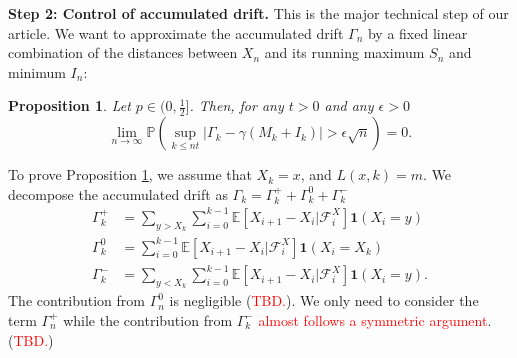 \documentclass[twoside,12pt,a4paper]{article}
\newtheorem{proposition}{Proposition}[section]
\numberwithin{equation}{section}
\newcommand{\abs}[1]{\left\vert #1 \right\vert}
\newcommand\TBD{\textcolor{red}{TBD.}}
\begin{document}
	\textbf{Step 2: Control of accumulated drift.} This is the major technical step of our article. We want to approximate the accumulated drift $\Gamma_n$ by a fixed linear combination of the distances between $X_n$ and its running maximum $S_n$ and minimum $I_n$:
	\begin{proposition}\label{lm: control of acc drift}
		Let $p\in (0,\frac{1}{2}]$. Then, for any $t>0$ and any $\epsilon >0$
		\begin{equation}\label{eq: control of acc drift}
			\lim_{n \to \infty }\mathbb{P}\left(\sup_{k\leq nt} \abs{\Gamma_k - \gamma \left(M_k + I_k \right)   } > \epsilon \sqrt{n}  \right) =0. 
		\end{equation}
	\end{proposition}
	To prove Proposition \ref{lm: control of acc drift}, we assume that $X_k=x $, and $L(x,k)=m$. We decompose the accumulated drift as $\Gamma_k = 	\Gamma_k^+ +	\Gamma_k^0 + \Gamma_k^-$ 
	\begin{align}
		\Gamma_k^+ &= \sum_{y > X_k} \sum_{i = 0}^{k-1} \mathbb{E}\left[ X_{i + 1} - X_i | \mathcal{F}_i^X \right] \mathbf{1}(X_i = y)\\
		\Gamma_k^0 &= \sum_{i = 0}^{k-1} \mathbb{E}\left[ X_{i + 1} - X_i | \mathcal{F}_i^X \right] \mathbf{1}(X_i = X_k) \\
		\Gamma_k^- &= \sum_{y < X_k} \sum_{i = 0}^{k-1} \mathbb{E}\left[ X_{i + 1} - X_i | \mathcal{F}_i^X \right] \mathbf{1}(X_i = y)
		.\end{align} 
	The contribution from $\Gamma_n^0$ is negligible (\TBD). We only need to consider the term $\Gamma_n^+$ while the contribution from $\Gamma_k^-$ \textcolor{red}{almost follows a symmetric argument}. (\TBD) 
	
\end{document}
